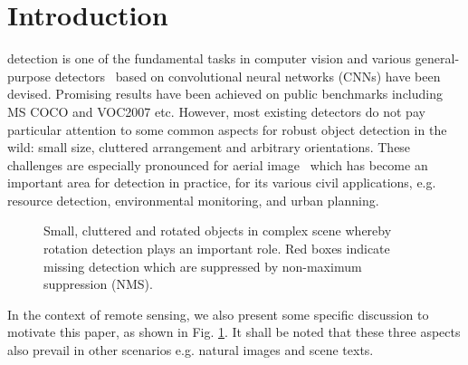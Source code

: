 \documentclass[10pt,journal,compsoc]{IEEEtran}
\begin{document}
\maketitle
\section{Introduction}

 detection is one of the fundamental tasks in computer vision and various general-purpose detectors~\cite{girshick2014rich,he2014spatial,girshick2015fast,liu2016ssd,redmon2016you,dai2016r,ren2017faster} based on convolutional neural networks (CNNs) have been devised. Promising results have been achieved on public benchmarks including MS COCO \cite{lin2014microsoft} and VOC2007 \cite{everingham2010pascal} etc. However, most existing detectors do not pay particular attention to some common aspects for robust object detection in the wild: small size, cluttered arrangement and arbitrary orientations. These challenges are especially pronounced for aerial image~\cite{xia2018dota,li2020object, cheng2016learning, liu2017high} which has become an important area for detection in practice, for its various civil applications, e.g. resource detection, environmental monitoring, and urban planning. 



\begin{figure}[!tb]
	\centering
	\caption{Small, cluttered and rotated objects in complex scene whereby rotation detection plays an important role. Red boxes indicate missing detection which are suppressed by non-maximum suppression (NMS).}
	\label{fig:ship}
\end{figure}

In the context of remote sensing, we also present some specific discussion to motivate this paper, as shown in Fig. \ref{fig:ship}. It shall be noted that these three aspects also prevail in other scenarios e.g. natural images and scene texts.
\end{document}
